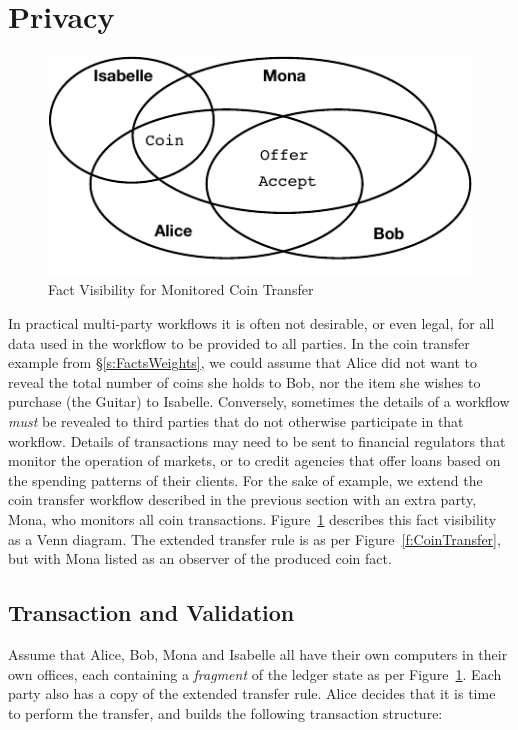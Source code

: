 

\section{Privacy}
\label{s:Privacy}

\begin{figure}
\begin{center}
\includegraphics{figure/coin-transfer-visibility.pdf}
\end{center}
\vspace{-2ex}
\caption{Fact Visibility for Monitored Coin Transfer}
\label{f:CoinTransferVisibility}
\end{figure}

In practical multi-party workflows it is often not desirable, or even legal, for all data used in the workflow to be provided to all parties. In the coin transfer example from \S\ref{s:FactsWeights}, we could assume that Alice did not want to reveal the total number of coins she holds to Bob, nor the item she wishes to purchase (the Guitar) to Isabelle. Conversely, sometimes the details of a workflow \emph{must} be revealed to third parties that do not otherwise participate in that workflow. Details of transactions may need to be sent to financial regulators that monitor the operation of markets, or to credit agencies that offer loans based on the spending patterns of their clients. For the sake of example, we extend the coin transfer workflow described in the previous section with an extra party, Mona, who monitors all coin transactions. Figure~\ref{f:CoinTransferVisibility} describes this fact visibility as a Venn diagram. The extended transfer rule is as per Figure~\ref{f:CoinTransfer}, but with Mona listed as an observer of the produced coin fact.


\subsection{Transaction and Validation}
\label{s:Transactions}
Assume that Alice, Bob, Mona and Isabelle all have their own computers in their own offices, each containing a \emph{fragment} of the ledger state as per Figure~\ref{f:CoinTransferVisibility}. Each party also has a copy of the extended transfer rule. Alice decides that it is time to perform the transfer, and builds the following transaction structure:

